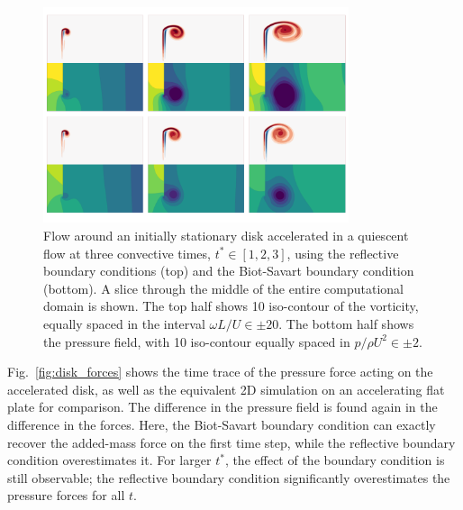 \documentclass[final,1p,times]{elsarticle}
\begin{document}
\begin{figure}
    \centering
    \includegraphics[trim={0cm 1cm 0cm 0.5cm},clip,width=0.8\textwidth]{tex/fig/flow_disk.png}
    \caption{Flow around an initially stationary disk accelerated in a quiescent flow at three convective times, $t^*\in [1,2,3]$, using the reflective boundary conditions (top) and the Biot-Savart boundary condition (bottom). A slice through the middle of the entire computational domain is shown. The top half shows 10 iso-contour of the vorticity, equally spaced in the interval $\omega L/U\in\pm20$. The bottom half shows the pressure field, with 10 iso-contour equally spaced in $p/\rho U^2\in\pm2$.}
    \label{fig:disk_flow_1}
\end{figure}


Fig.~\ref{fig:disk_forces} shows the time trace of the pressure force acting on the accelerated disk, as well as the equivalent 2D simulation on an accelerating flat plate for comparison. The difference in the pressure field is found again in the difference in the forces. Here, the Biot-Savart boundary condition can exactly recover the added-mass force on the first time step, while the reflective boundary condition overestimates it. For larger $t^*$, the effect of the boundary condition is still observable; the reflective boundary condition significantly overestimates the pressure forces for all $t$. 
\end{document}
